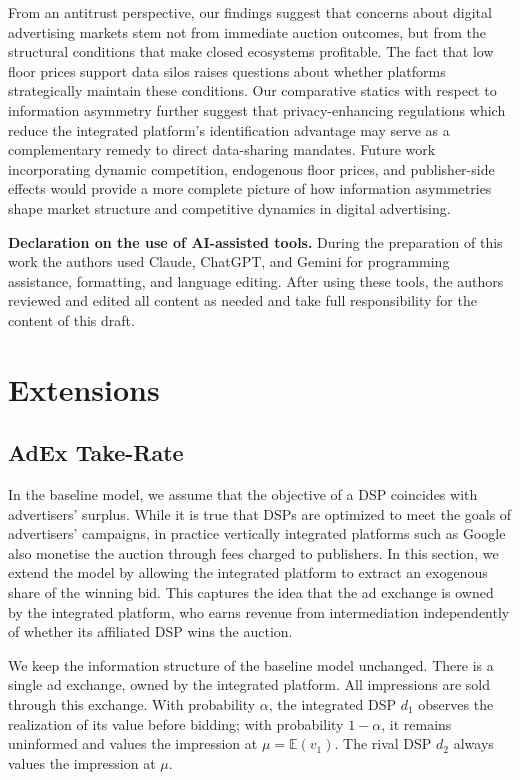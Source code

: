 \noindent From an antitrust perspective, our findings suggest that concerns about digital advertising markets stem not from immediate auction outcomes, but from the structural conditions that make closed ecosystems profitable. The fact that low floor prices support data silos raises questions about whether platforms strategically maintain these conditions. Our comparative statics with respect to information asymmetry further suggest that privacy-enhancing regulations which reduce the integrated platform's identification advantage may serve as a complementary remedy to direct data-sharing mandates. Future work incorporating dynamic competition, endogenous floor prices, and publisher-side effects would provide a more complete picture of how information asymmetries shape market structure and competitive dynamics in digital advertising.

\noindent\textbf{Declaration on the use of AI-assisted tools.} During the preparation of this work the authors used Claude, ChatGPT, and Gemini for programming assistance, formatting, and language editing. After using these tools, the authors reviewed and edited all content as needed and take full responsibility for the content of this draft.


\renewcommand{\thesection}{\Alph{section}}
\setcounter{section}{0}

\section{Extensions}

\subsection{AdEx Take-Rate}

In the baseline model, we assume that the objective of a DSP coincides with advertisers' surplus. While it is true that DSPs are optimized to meet the goals of advertisers' campaigns, in practice vertically integrated platforms such as Google also monetise the auction through fees charged to publishers. In this section, we extend the model by allowing the integrated platform to extract an exogenous share of the winning bid. This captures the idea that the ad exchange is owned by the integrated platform, who earns revenue from intermediation independently of whether its affiliated DSP wins the auction.

We keep the information structure of the baseline model unchanged. There is a single ad exchange, owned by the integrated platform. All impressions are sold through this exchange. With probability $ \alpha $, the integrated DSP $ d_1 $ observes the realization of its value before
bidding; with probability $ 1 - \alpha $, it remains uninformed and values the impression at $ \mu = \mathbb{E}(v_1) $. The rival DSP $ d_2 $ always values the impression at $ \mu $.

